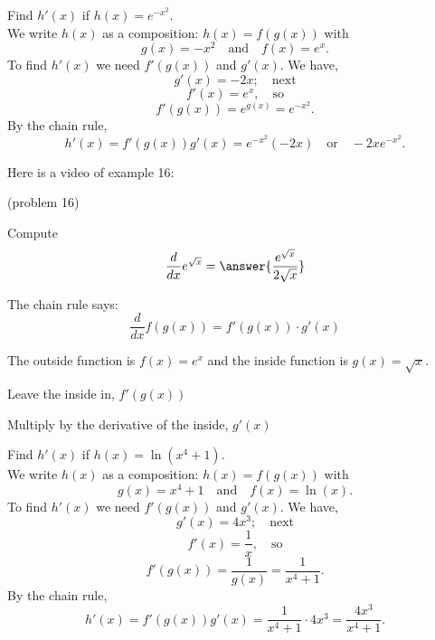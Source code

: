 \documentclass[handout]{ximera}
\begin{document}
\begin{example}[example 16]
Find $h'(x)$ if $h(x) = e^{-x^2}$.\\
We write $h(x)$ as a composition: $h(x)=f(g(x))$ with 
\[g(x) = -x^2  \quad \text{and} \quad  f(x) =e^x.\]
 To find $h'(x)$ we need $f'(g(x))$ and $g'(x)$. We have, 
\[g'(x) = -2x; \quad \text{next} \] 
\[f'(x) = e^x, \quad \text{so} \]
\[f'(g(x)) = e^{g(x)} = e^{-x^2}.\]
By the chain rule,
\[h'(x) = f'(g(x))g'(x) = e^{-x^2} (-2x) \quad \text{or} \quad -2xe^{-x^2}.\]
\end{example}

Here is a video of example 16:
\begin{foldable}
\end{foldable}

 

\begin{problem}(problem 16)

Compute
  \[
  \frac{d}{dx} e^{\sqrt x} = \answer{\frac{e^{\sqrt x}}{2\sqrt x}}
  \]
  
    \begin{hint}
      The chain rule says:
      \[
      \frac{d}{dx} f(g(x)) = f'(g(x))\cdot g'(x)
      \]
    \end{hint}
    \begin{hint}
      The outside function is $f(x) = e^x$ and the inside
      function is $g(x) = \sqrt x$.
    \end{hint}
    \begin{hint}
		  Leave the inside in, $f'(g(x))$
		\end{hint}
		\begin{hint}
		  Multiply by the derivative of the inside, $g'(x)$
		\end{hint}
		
\end{problem}



\begin{example}[example 17]
Find $h'(x)$ if $h(x) = \ln(x^4 +1)$.\\
We write $h(x)$ as a composition: $h(x)=f(g(x))$ with 
\[g(x) = x^4 + 1  \quad \text{and} \quad  f(x) = \ln(x).\]
 To find $h'(x)$ we need $f'(g(x))$ and $g'(x)$.  We have, 
\[g'(x) = 4x^3; \quad \text{next} \] 
\[f'(x) = \frac{1}{x}, \quad \text{so}\]
\[ f'(g(x)) =\frac{1}{g(x)} = \frac{1}{x^4 + 1} .\]
By the chain rule,
\[h'(x) = f'(g(x))g'(x) = \frac{1}{x^4 + 1} \cdot 4x^3 = \frac{4x^3}{x^4 + 1}.\]
\end{example}
\end{document}
